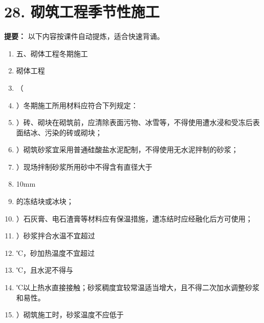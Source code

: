 \documentclass[UTF8,fontset=fandol,11pt]{ctexart}
\begin{document}
\newpage

\section*{28. 砌筑工程季节性施工}


\begin{mainbox}

\textbf{提要：} 以下内容按课件自动提炼，适合快速背诵。

\end{mainbox}

\begin{enumerate}[label=\arabic*.]

\item 五、砌体工程冬期施工

\item 砌体工程

\item （

\item ）冬期施工所用材料应符合下列规定：

\item ）砖、砌块在砌筑前，应清除表面污物、冰雪等，不得使用遭水浸和受冻后表面结冰、污染的砖或砌块；

\item ）砌筑砂浆宜采用普通硅酸盐水泥配制，不得使用无水泥拌制的砂浆；

\item ）现场拌制砂浆所用砂中不得含有直径大于

\item 10mm

\item 的冻结块或冰块；

\item ）石灰膏、电石渣膏等材料应有保温措施，遭冻结时应经融化后方可使用；

\item ）砂浆拌合水温不宜超过

\item ℃，砂加热温度不宜超过

\item ℃，且水泥不得与

\item ℃以上热水直接接触；砂浆稠度宜较常温适当增大，且不得二次加水调整砂浆和易性。

\item ）砌筑施工时，砂浆温度不应低于


\end{enumerate}
\end{document}
